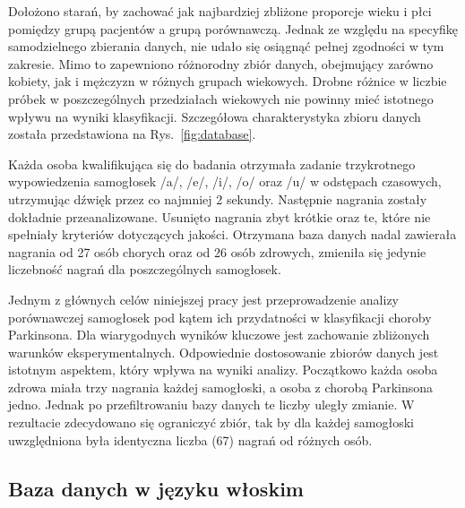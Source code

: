 Dołożono starań, by zachować jak najbardziej zbliżone proporcje wieku i płci pomiędzy grupą pacjentów a grupą porównawczą.
Jednak ze względu na specyfikę samodzielnego zbierania danych, nie udało się osiągnąć pełnej zgodności w tym zakresie.
Mimo to zapewniono różnorodny zbiór danych, obejmujący zarówno kobiety, jak i mężczyzn w różnych grupach wiekowych.
Drobne różnice w liczbie próbek w poszczególnych przedziałach wiekowych nie powinny mieć istotnego wpływu na wyniki
klasyfikacji.
Szczegółowa charakterystyka zbioru danych została przedstawiona na Rys.~\ref{fig:database}.

Każda osoba kwalifikująca się do badania otrzymała zadanie trzykrotnego wypowiedzenia
samogłosek /a/, /e/, /i/, /o/ oraz /u/ w odstępach czasowych, utrzymując dźwięk przez co najmniej 2 sekundy.
Następnie nagrania zostały dokładnie przeanalizowane.
Usunięto nagrania zbyt krótkie oraz te, które nie spełniały kryteriów dotyczących jakości.
Otrzymana baza danych nadal zawierała nagrania od 27 osób chorych oraz od 26 osób zdrowych, zmieniła się jedynie liczebność nagrań dla poszczególnych
samogłosek.

Jednym z głównych celów niniejszej pracy jest przeprowadzenie analizy porównawczej samogłosek pod kątem ich przydatności w klasyfikacji choroby Parkinsona.
Dla wiarygodnych wyników kluczowe jest zachowanie zbliżonych warunków eksperymentalnych. Odpowiednie dostosowanie zbiorów danych jest istotnym aspektem,
który wpływa na wyniki analizy.
Początkowo każda osoba zdrowa miała trzy nagrania każdej samogłoski, a osoba z chorobą Parkinsona jedno.
Jednak po przefiltrowaniu bazy danych te liczby uległy zmianie.
W rezultacie zdecydowano się ograniczyć zbiór, tak by dla każdej samogłoski uwzględniona była identyczna liczba (67) nagrań od różnych osób.


\subsection{Baza danych w języku włoskim}
\label{subsec:włoska-baza}


